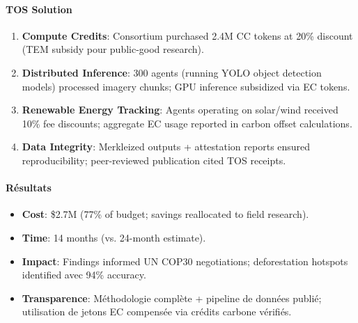 \documentclass[11pt]{article}
\begin{document}
\paragraph{TOS Solution}
\begin{enumerate}[noitemsep]
  \item \textbf{Compute Credits}: Consortium purchased 2.4M CC tokens at 20\% discount (TEM subsidy pour public-good research).
  \item \textbf{Distributed Inference}: 300 agents (running YOLO object detection models) processed imagery chunks; GPU inference subsidized via EC tokens.
  \item \textbf{Renewable Energy Tracking}: Agents operating on solar/wind received 10\% fee discounts; aggregate EC usage reported in carbon offset calculations.
  \item \textbf{Data Integrity}: Merkleized outputs + attestation reports ensured reproducibility; peer-reviewed publication cited TOS receipts.
\end{enumerate}

\paragraph{Résultats}
\begin{itemize}[noitemsep]
  \item \textbf{Cost}: \$2.7M (77\% of budget; savings reallocated to field research).
  \item \textbf{Time}: 14 months (vs. 24-month estimate).
  \item \textbf{Impact}: Findings informed UN COP30 negotiations; deforestation hotspots identified avec 94\% accuracy.
  \item \textbf{Transparence}: Méthodologie complète + pipeline de données publié; utilisation de jetons EC compensée via crédits carbone vérifiés.
\end{itemize}
\end{document}
